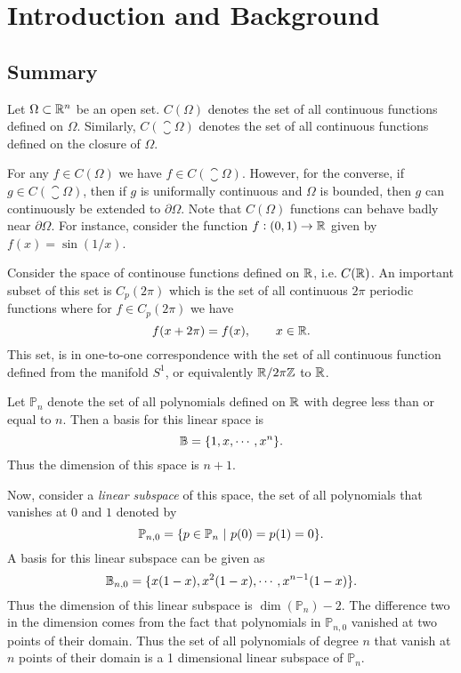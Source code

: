 \chapter{Introduction and Background}


\section{Summary}

\begin{summary}
	Let $ \Omega \subset \mathbb{R}^n $ be an open set. $ C(\Omega) $ denotes the set of all continuous functions defined on $ \Omega $. Similarly, $ C(\closure{\Omega}) $ denotes the set of all continuous functions defined on the closure of $ \Omega $.
	
	For any $ f \in C(\Omega) $ we have $ f \in C(\closure{\Omega}) $. However, for the converse, if $ g \in C(\closure{\Omega}) $, then if $ g $ is uniformally continuous and $ \Omega $ is bounded, then $ g $ can continuously be extended to $ \partial \Omega $. Note that $ C(\Omega) $ functions can behave badly near $ \partial \Omega $. For instance, consider the function $ f:(0,1) \to \mathbb{R} $ given by $ f(x) = \sin(1/x) $.
\end{summary}

\begin{summary}
	Consider the space of continouse functions defined on $ \mathbb{R} $, i.e. $ C(\mathbb{R}) $. An important subset of this set is $ C_p(2\pi) $ which is the set of all continuous $ 2\pi $ periodic functions where for $ f \in C_p(2\pi) $ we have
	\[ f(x+2\pi) = f(x), \qquad x\in \mathbb{R}. \]
	This set, is in one-to-one correspondence with the set of all continuous function defined from the manifold $ S^1 $, or equivalently $ \mathbb{R}/2\pi\mathbb{Z} $ to $ \mathbb{R} $.
\end{summary}

\begin{summary}
	Let $ \mathbb{P}_n $ denote the set of all polynomials defined on $ \mathbb{R} $ with degree less than or equal to $ n $. Then a basis for this linear space is 
	\[ \mathbb{B} = \{1,x,\cdots, x^n\}. \]
	Thus the dimension of this space is $ n+1 $.
	
	Now, consider a \emph{linear subspace} of this space, the set of all polynomials that vanishes at $ 0 $ and $ 1 $ denoted by
	\[ \mathbb{P}_{n,0} = \{p \in \mathbb{P}_n\ |\ p(0)= p(1) = 0\}. \]
	A basis for this linear subspace can be given as
	\[ \mathbb{B}_{n,0} = \{x(1-x),x^2(1-x),\cdots,x^{n-1}(1-x)\}. \]
	Thus the dimension of this linear subspace is $ \dim(\mathbb{P}_n) - 2 $. The difference two in the dimension comes from the fact that polynomials in $ \mathbb{P}_{n,0} $ vanished at two points of their domain. Thus the set of all polynomials of degree $ n $ that vanish at $ n $ points of their domain is a 1 dimensional linear subspace of $ \mathbb{P}_n $.
\end{summary}






